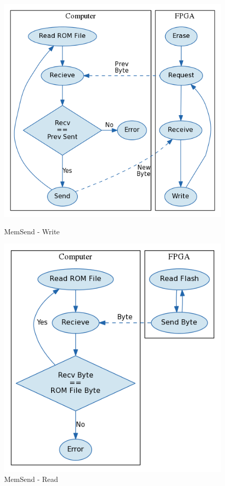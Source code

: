 \documentclass{article}
\begin{document}
\begin{figure}[H]
    \centering
    \begin{minipage}[b]{0.45\linewidth}
        \centering
        \includegraphics[width=\textwidth]{../../fpga/rom_flasher/doc/block_diagram_write.png}
        \caption{MemSend - Write}
        \label{fig:rom_write}
    \end{minipage}
    \hfill
    \begin{minipage}[b]{0.45\linewidth}
        \centering
        \includegraphics[width=\textwidth]{../../fpga/rom_flasher/doc/block_diagram_read.png}
        \caption{MemSend - Read}
        \label{fig:rom_read}
    \end{minipage}
\end{figure}
\end{document}
